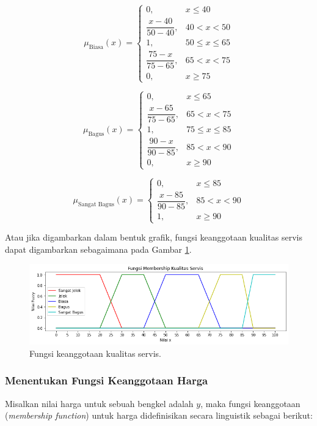 \documentclass[12pt,a4paper]{article}
\theoremstyle{remark}
\begin{document}
\[
    \mu_{\text{Biasa}}(x) =
    \begin{cases}
        0,                       & x \leq 40         \\
        \dfrac{x - 40}{50 - 40}, & 40 < x < 50       \\
        1,                       & 50 \leq x \leq 65 \\
        \dfrac{75 - x}{75 - 65}, & 65 < x < 75       \\
        0,                       & x \geq 75
    \end{cases}
\]

\[
    \mu_{\text{Bagus}}(x) =
    \begin{cases}
        0,                       & x \leq 65         \\
        \dfrac{x - 65}{75 - 65}, & 65 < x < 75       \\
        1,                       & 75 \leq x \leq 85 \\
        \dfrac{90 - x}{90 - 85}, & 85 < x < 90       \\
        0,                       & x \geq 90
    \end{cases}
\]

\[
    \mu_{\text{Sangat Bagus}}(x) =
    \begin{cases}
        0,                       & x \leq 85   \\
        \dfrac{x - 85}{90 - 85}, & 85 < x < 90 \\
        1,                       & x \geq 90
    \end{cases}
\]

Atau jika digambarkan dalam bentuk grafik, fungsi keanggotaan kualitas servis dapat digambarkan sebagaimana pada Gambar \ref{fig:member_servis}.
\begin{figure}[H]
    \centering
    \includegraphics[width=1\linewidth]{images/member_servis.png}
    \caption{Fungsi keanggotaan kualitas servis.}
    \label{fig:member_servis}
\end{figure}


\subsubsection*{Menentukan Fungsi Keanggotaan Harga}
Misalkan nilai harga untuk sebuah bengkel adalah $y$,
maka fungsi keanggotaan (\textit{membership function}) untuk harga didefinisikan secara linguistik sebagai berikut:
\end{document}
